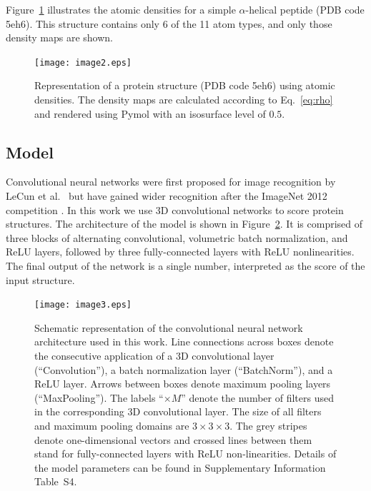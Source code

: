 \documentclass{bioinfo}
\begin{document}
Figure~\ref{Fig:atomic_densities} illustrates the atomic densities for
a simple $\alpha$-helical peptide (PDB code 5eh6). This structure
contains only 6 of the 11 atom types, and only those density maps are
shown.

\begin{figure}[!tpb]
    \centering
    \texttt{[image: image2.eps]}

    \caption{Representation of a protein structure (PDB code 5eh6)
    using atomic densities. The density maps are calculated according
    to Eq.~\ref{eq:rho} and rendered using Pymol \citep{PyMOL} with an
    isosurface level of $0.5$.}

    \label{Fig:atomic_densities}
\end{figure}


\subsection{Model}
Convolutional neural networks were first proposed for image
recognition by LeCun et al.\ \citep{lecun1989backpropagation} but have
gained wider recognition after the ImageNet 2012
competition \citep{krizhevsky2012imagenet}. In this work we use 3D
convolutional networks to score protein structures. The architecture
of the model is shown in Figure~\ref{Fig:CNNModel}.  It is comprised of
three blocks of alternating convolutional, volumetric batch
normalization, and ReLU layers, followed by three fully-connected
layers with ReLU nonlinearities. The final output of the network is a
single number, interpreted as the score of the input structure.

\begin{figure}[!tpb]
    \centering
    \texttt{[image: image3.eps]}

    \caption{Schematic representation of the convolutional neural
    network architecture used in this work. Line connections across
    boxes denote the consecutive application of a 3D convolutional
    layer (``Convolution''), a batch normalization layer
    (``BatchNorm''), and a ReLU layer. Arrows between boxes denote
    maximum pooling layers (``MaxPooling''). The labels ``$\times M$''
    denote the number of filters used in the corresponding 3D
    convolutional layer. The size of all filters and maximum pooling
    domains are $3\times 3\times 3$. The grey stripes denote
    one-dimensional vectors and crossed lines between them stand for
    fully-connected layers with ReLU non-linearities. Details of the
    model parameters can be found in Supplementary Information Table~S4.}

    \label{Fig:CNNModel}
\end{figure}
\end{document}
